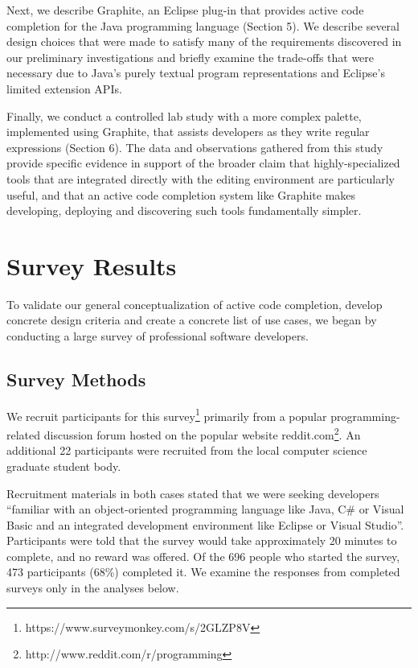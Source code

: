 \documentclass[10pt, conference, compsocconf]{IEEEtran}
\begin{document}
Next, we describe Graphite, an Eclipse plug-in that provides active code completion for the Java programming language (Section 5). We describe several design choices that were made to satisfy many of the requirements discovered in our preliminary investigations and briefly examine the trade-offs that were necessary due to Java's purely textual program representations and Eclipse's limited extension APIs.

Finally, we conduct a controlled lab study with a more complex palette, implemented using Graphite, that assists  developers as they write regular expressions (Section 6). The data and observations gathered from this study provide  specific evidence in support of the broader claim that highly-specialized tools that are integrated directly with the editing environment are particularly useful, and that an active code completion system like Graphite makes developing, deploying and discovering such tools fundamentally simpler.

\section{Survey Results}
To validate our general conceptualization of active code completion, develop concrete design criteria and create a concrete list of use cases, we began by conducting a large survey of professional software developers.

\subsection{Survey Methods}
We recruit participants for this survey\footnote{https://www.surveymonkey.com/s/2GLZP8V} primarily from a popular programming-related discussion forum hosted on the popular website reddit.com\footnote{http://www.reddit.com/r/programming}. An additional 22 participants were recruited from the local computer science graduate student body. 

Recruitment materials in both cases stated that we were seeking developers ``familiar with an object-oriented programming language like Java, C\# or Visual Basic and an integrated development environment like Eclipse or Visual Studio''.
Participants were told that the survey would take approximately 20 minutes to complete, and no reward was offered. Of the 696 people who started the survey, 473 participants (68\%) completed it. We examine the responses from completed surveys only in the analyses below.
\end{document}
